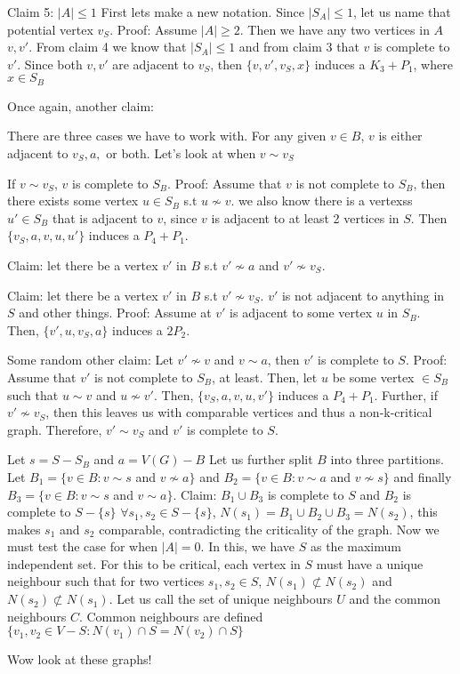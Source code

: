 \documentclass[12pt]{article}
\begin{document}

Claim 5: $|A| \leq 1$
First lets make a new notation. Since $|S_A| \leq 1$, let us name that potential vertex $v_S$.
Proof: Assume $|A| \geq 2$. Then we have any two vertices in $A$ $v, v'$. From claim 4 we know that $|S_A| \leq 1$ and from claim 3 that $v$ is complete to $v'$. Since both $v, v'$ are adjacent to $v_S$, then  $\{v, v', v_S, x \}$ induces a $K_3 + P_1$, where $x \in S_B$

Once again, another claim:

There are three cases we have to work with.
For any given  $v \in B$, $v$ is either adjacent to $v_S, a,$ or both. Let's look at when $v \sim v_S$

If $v \sim v_S$, $v$ is complete to $S_B$. Proof: Assume that $v$ is not complete to $S_B$, then there exists some vertex $u \in S_B$ s.t $u \not \sim v$. we also know there is a vertexss $u' \in S_B$ that is adjacent to $v$, since $v$ is adjacent to at least 2 vertices in $S$. Then $\{v_S, a, v, u, u'\}$ induces a $P_4 + P_1$.

Claim: let there be a vertex $v'$ in $B$ s.t $v' \not \sim a$ and $v' \not \sim v_S$.

Claim: let there be a vertex $v'$ in $B$ s.t $v' \not \sim v_S$. $v'$ is not adjacent to anything in $S$ and other things.
Proof: Assume at $v'$ is adjacent to some vertex $u$ in $S_B$. Then, $\{ v', u, v_S, a \}$ induces a $2P_2$.

Some random other claim: Let $v' \not \sim v$ and $v \sim a$, then $v'$ is complete to $S$.
Proof: Assume that $v'$ is not complete to $S_B$, at least. Then, let $u$ be some vertex $\in S_B$ such that $u \sim v$ and $u \not \sim v'$. Then, $\{v_S, a, v, u, v' \}$ induces a $P_4 + P_1$. Further, if $v' \not \sim v_S$, then this leaves us with comparable vertices and thus a non-k-critical graph. Therefore, $v' \sim v_S$ and $v'$ is complete to $S$.

Let $s = S - S_B$ and $a = V(G) - B$
Let us further split $B$ into three partitions. Let $B_1 = \{v \in B : v \sim s$ and $v \not \sim a \}$ and $B_2  =\{v \in B : v \sim a$ and $v \not \sim s \}$ and finally $B_3 = \{v \in B : v \sim s$ and $v \sim a \}$.
Claim: $B_1 \cup B_3$ is complete to $S$ and $B_2$ is complete to $S - \{s\}$
$\forall s_1, s_2 \in S - \{ s \}$, $N(s_1) = B_1 \cup B_2 \cup B_3 = N(s_2)$, this makes $s_1$ and $s_2$ comparable, contradicting the criticality of the graph.
%
Now we must test the case for when $|A| = 0$. In this, we have $S$ as the maximum independent set. For this to be critical, each vertex in $S$ must have a unique neighbour such that for two vertices $s_1, s_2 \in S$, $N(s_1) \not \subset N(s_2)$ and $N(s_2) \not \subset N(s_1)$.
Let us call the set of unique neighbours $U$ and the common neighbours $C$.
Common neighbours are defined $\{ v_1, v_2 \in V - S : N(v_1) \cap S = N(v_2) \cap S \}$

Wow look at these graphs!
\end{document}
